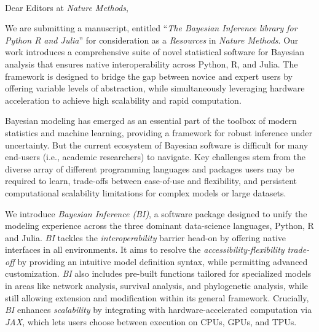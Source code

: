 \documentclass[10pt,a4paper]{letter} %
\def\opening#1{\thispagestyle{empty}
{\centering\fromaddress \vspace{0.6in} \\ %
\hspace*{0.8\longindentation}\hspace*{\fill}\par} %
{\raggedright \toname \toaddress

\par} %
\vspace{0.4in} %
\noindent #1 %
}
\begin{document}

\begin{letter}
{

}

\opening{Dear Editors at \emph{Nature Methods},}
 
We are submitting a manuscript, entitled “\emph{The Bayesian Inference library for Python R and Julia}” for consideration as a \emph{Resources} in \emph{Nature Methods}. Our work introduces a comprehensive suite of novel statistical software for Bayesian analysis that ensures native interoperability across Python, R, and Julia. The framework is designed to bridge the gap between novice and expert users by offering variable levels of abstraction, while simultaneously leveraging hardware acceleration to achieve high scalability and rapid computation.

Bayesian modeling has emerged as an essential part of the toolbox of modern statistics and machine learning, providing a framework for robust inference under uncertainty. But the current ecosystem of Bayesian software is difficult for many end-users (i.e., academic researchers) to navigate. Key challenges stem from the diverse array of different programming languages and packages users may be required to learn, trade-offs between ease-of-use and flexibility, and persistent computational scalability limitations for complex models or large datasets.

We introduce \textit{Bayesian Inference (BI)}, a software package designed to unify the modeling experience across the three dominant data-science languages, Python, R and Julia. \textit{BI} tackles the \textit{interoperability} barrier head-on by offering native interfaces in all environments. It aims to resolve the \textit{accessibility-flexibility trade-off} by providing an intuitive model definition syntax, while permitting advanced customization. \textit{BI} also includes pre-built functions tailored for specialized models in areas like network analysis, survival analysis, and phylogenetic analysis, while still allowing extension and modification within its general framework. Crucially, \textit{BI} enhances \textit{scalability} by integrating with hardware-accelerated computation via \textit{JAX}, which lets users choose between execution on CPUs, GPUs, and TPUs. 


\end{letter}
\end{document}
